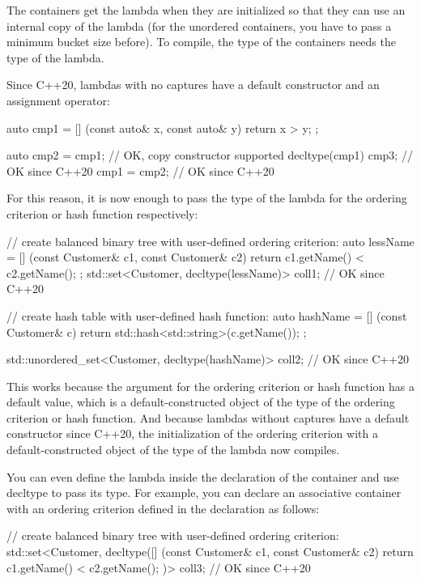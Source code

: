 The containers get the lambda when they are initialized so that they can use an internal copy of the lambda (for the unordered containers, you have to pass a minimum bucket size before). To compile, the type of the containers needs the type of the lambda.

Since C++20, lambdas with no captures have a default constructor and an assignment operator:

\begin{cpp}
auto cmp1 = [] (const auto& x, const auto& y) {
				return x > y;
			};
			
auto cmp2 = cmp1; // OK, copy constructor supported
decltype(cmp1) cmp3; // OK since C++20
cmp1 = cmp2; // OK since C++20
\end{cpp}

For this reason, it is now enough to pass the type of the lambda for the ordering criterion or hash function respectively:

\begin{cpp}
// create balanced binary tree with user-defined ordering criterion:
auto lessName = [] (const Customer& c1, const Customer& c2) {
					return c1.getName() < c2.getName();
				};
std::set<Customer, decltype(lessName)> coll1; // OK since C++20

// create hash table with user-defined hash function:
auto hashName = [] (const Customer& c) {
					return std::hash<std::string>{}(c.getName());
				};

std::unordered_set<Customer, decltype(hashName)> coll2; // OK since C++20
\end{cpp}

This works because the argument for the ordering criterion or hash function has a default value, which is a default-constructed object of the type of the ordering criterion or hash function. And because lambdas without captures have a default constructor since C++20, the initialization of the ordering criterion with a default-constructed object of the type of the lambda now compiles.

You can even define the lambda inside the declaration of the container and use decltype to pass its type. For example, you can declare an associative container with an ordering criterion defined in the declaration as follows:

\begin{cpp}
// create balanced binary tree with user-defined ordering criterion:
std::set<Customer,
		decltype([] (const Customer& c1, const Customer& c2) {
			return c1.getName() < c2.getName();
		})> coll3; // OK since C++20
\end{cpp}


